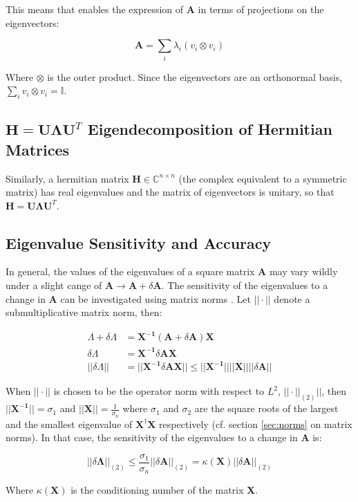 This means that  enables the expression of $\mathbf{A}$ in terms of projections on the eigenvectors:

\begin{equation}
\mathbf{A} = \sum_i \lambda_i (v_i \otimes v_i)
\end{equation}

Where $\otimes$ is the outer product. Since the eigenvectors are an orthonormal basis, $\sum_i v_i \otimes v_i = \mathbb{I}$.


\subsection{$\mathbf{H} = \mathbf{U\Lambda U}^T$ Eigendecomposition of Hermitian Matrices}

Similarly, a hermitian matrix $\mathbf{H} \in \mathbb{C}^{n\times n}$ (the complex equivalent to a symmetric matrix) has real eigenvalues and the matrix of eigenvectors is unitary, so that $\mathbf{H} = \mathbf{U\Lambda U}^T$.


\subsection{Eigenvalue Sensitivity and Accuracy}

In general, the values of the eigenvalues of a square matrix $\mathbf{A}$ may vary wildly under a slight cange of $\mathbf{A} \rightarrow \mathbf{A}+\delta\mathbf{A}$. The sensitivity of the eigenvalues to a change in $\mathbf{A}$ can be investigated using matrix norms \cite{mathworkseig}. Let $||\cdot||$ denote a submultiplicative matrix norm, then:

\begin{equation}
\begin{array}{rl}
\Lambda + \delta\Lambda &= \mathbf{X^{-1}}\left( \mathbf{A} + \delta\mathbf{A} \right)\mathbf{X} \\
\delta\Lambda &= \mathbf{X^{-1}} \delta \mathbf{A} \mathbf{X}\\
||\delta\Lambda || &= ||\mathbf{X^{-1}} \delta \mathbf{A} \mathbf{X} || \leq  ||\mathbf{X^{-1}}|| ||\mathbf{X}|| ||\delta\mathbf{A}||
\end{array}
\end{equation}

When $||\cdot||$ is chosen to be the operator norm with respect to $L^2$, $||\cdot||_{(2)}||$, then $||\mathbf{X^{-1}}|| = \sigma_1$ and $||\mathbf{X}|| = \frac{1}{\sigma_n}$ where $\sigma_1$ and $\sigma_2$ are the square roots of the largest and the smallest eigenvalue of $\mathbf{X^{\dagger}}\mathbf{X}$ respectively (cf. section \ref{sec:norms} on matrix norms). In that case, the sensitivity of the eigenvalues to a change in $\mathbf{A}$ is:

\begin{equation}
||\delta\mathbf{\Lambda}||_{(2)} \leq \frac{\sigma_1}{\sigma_n} ||\delta\mathbf{A}||_{(2)} = \kappa(\mathbf{X})||\delta\mathbf{A}||_{(2)}
\end{equation}

Where $\kappa(\mathbf{X})$ is the conditioning number of the matrix $\mathbf{X}$. 

